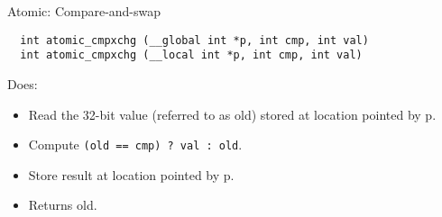 \documentclass[english,compress]{beamer}
\begin{document}
\begin{frame}[fragile]{Atomic: Compare-and-swap}
  \begin{lstlisting}
  int atomic_cmpxchg (__global int *p, int cmp, int val)
  int atomic_cmpxchg (__local int *p, int cmp, int val)
  \end{lstlisting}

  Does:
  \begin{itemize}
    \item Read the 32-bit value (referred to as
    old) stored at location pointed by p.
  \item Compute \texttt{(old == cmp) ? val : old}.
  \item Store result at location pointed by p.
  \item Returns old.
  \end{itemize}
\end{frame}
\end{document}

